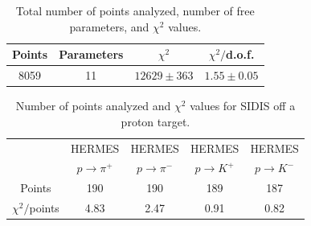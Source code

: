 \documentclass[aps,preprintnumbers,showpacs,nofootinbib,superscriptaddress,floatfix]{revtex4}
\begin{document}
\begin{table}[h!]
\small
  \centering
  \begin{tabular}{|c|c|c|c|}
\hline
\hline
Points& Parameters & $\chi^2$& $\chi^2/$d.o.f. \\
\hline
8059 & 11  & $12629 \pm 363$ & $1.55 \pm 0.05$ \\
\hline
\hline
\end{tabular}
\caption{Total number of points analyzed, number of free parameters, and $\chi^2$ values.}
\label{t:fl_ind_chi2}
\end{table}

\begin{table}[h!]
\begin{center}
\begin{tabular}{|c|c|c|c|c|}
 \hline
\hline
  & HERMES & HERMES & HERMES & HERMES \\   
 &  $p \to \pi^+$    &   $p \to \pi^-$    &  $p \to K^+$    &   $p \to K^-$
 \\
 \hline
 Points         &  190 & 190 & 189 & 187       \\
 \hline
$\chi^2 /$points &4.83 & 2.47 & 0.91 & 0.82   \\            
\hline
\hline
\end{tabular}
\caption{Number of points analyzed and $\chi^2$ values for SIDIS off a proton target.}
\label{t:fl_ind_chi2_eP}
\end{center}
\end{table}
\end{document}
